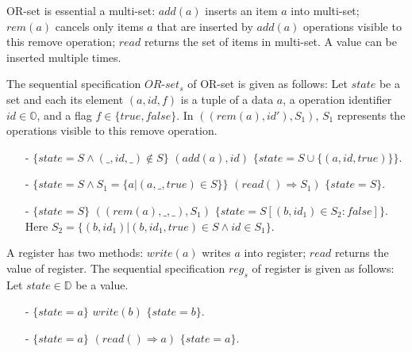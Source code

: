 {\begin{example}
\label{definition:sequential specification of or-set}
OR-set is essential a multi-set: $\mathit{add}(a)$ inserts an item $a$ into multi-set; $\mathit{rem}(a)$ cancels only items $a$ that are inserted by $\mathit{add}(a)$ operations visible to this remove operation; $\mathit{read}$ returns the set of items in multi-set. A value can be inserted multiple times.

The sequential specification $\mathit{OR}$-$\mathit{set}_s$ of OR-set is given as follows: Let $\mathit{state}$ be a set and each its element $(a,\mathit{id},f)$ is a tuple of a data $a$, a operation identifier $\mathit{id} \in \mathbb{O}$, and a flag $f \in \{ \mathit{true},\mathit{false} \}$. In $((rem(a),\mathit{id}'),S_1)$, $S_1$ represents the operations visible to this remove operation.
\begin{itemize}
\setlength{\itemsep}{0.5pt}
\item[-] $\{ \mathit{state} = S  \wedge (\_,\mathit{id},\_) \notin S \}$ $(\mathit{add}(a),\mathit{id})$ $\{ \mathit{state} = S \cup \{ (a,\mathit{id},\mathit{true}) \} \}$.
\item[-] $\{ \mathit{state} = S \wedge S_1 = \{ a \vert (a,\_,\mathit{true}) \in S \} \}$ $(\mathit{read}() \Rightarrow S_1)$ $\{ \mathit{state} = S \}$.
\item[-] $\{ \mathit{state} = S \}$ $((rem(a),\_,\_),S_1)$ $\{ \mathit{state} = S[(b,\mathit{id}_1) \in S_2 : \mathit{false}] \}$. Here $S_2 = \{ (b,\mathit{id}_1) \vert (b,\mathit{id}_1,\mathit{true}) \in S \wedge id \in S_1 \}$.
\end{itemize}
\end{example}


\begin{example}
\label{definition:sequential specification of register}
A register has two methods: $\mathit{write}(a)$ writes $a$ into register; $\mathit{read}$ returns the value of register. The sequential specification $\mathit{reg}_s$ of register is given as follows: Let $\mathit{state} \in \mathbb{D}$ be a value.
\begin{itemize}
\setlength{\itemsep}{0.5pt}
\item[-] $\{ \mathit{state} = a  \}$ $\mathit{write}(b)$ $\{ \mathit{state} = b \}$.
\item[-] $\{ \mathit{state} = a \}$ $(\mathit{read}() \Rightarrow a)$ $\{ \mathit{state} = a \}$.
\end{itemize}
\end{example}




}
